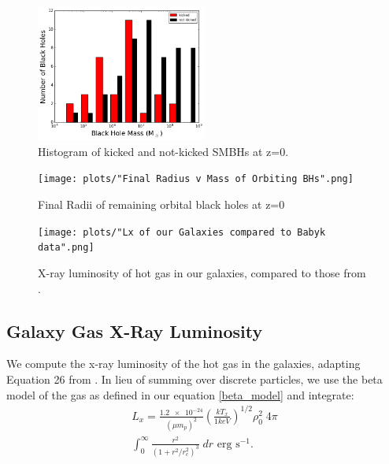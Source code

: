 \documentclass[english, apj]{emulateapj}
\begin{document}
\begin{figure}[ht]
\begin{center}
\includegraphics[width=0.5\textwidth]{plots/kicked_stats.png}
\caption{Histogram of kicked and not-kicked SMBHs at z=0.}
\label{fig:kicked_stats}
\end{center}
\end{figure}

\begin{figure}[htbp]
\begin{center}
\texttt{[image: plots/"Final Radius v Mass of Orbiting BHs".png]}
\caption{Final Radii of remaining orbital black holes at z=0}
\label{fig:mvr}
\end{center}
\end{figure}

\begin{figure}[htbp]
\vspace{20pt}%
\begin{center}
\texttt{[image: plots/"Lx of our Galaxies compared to Babyk data".png]}
\caption{X-ray luminosity of hot gas in our galaxies, compared to those from \citet{2018ApJ...857...32B}.}
\label{fig:galgas1}
\end{center}
\end{figure}

\subsection{Galaxy Gas X-Ray Luminosity}
We compute the x-ray luminosity of the hot gas in the galaxies, adapting Equation 26 from \citet{2012ApJ...754..125C}. In lieu of summing over discrete particles, we use the beta model of the gas as defined in our equation \ref{beta_model} and integrate:
\begin{equation}
\begin{aligned}
    L_x ={} \frac{\num{1.2e-24}}{(\mu m_p)^2}\left(\frac{kT_x}{1keV}\right)^{1/2}\rho_0^{2}\;4{\pi} \\
    \int_{0}^{\infty}\frac{r^2}{(1+r^2/r_c^2)^{3}}\;dr\text{  erg s}^{-1}.
\end{aligned}
\end{equation}
\end{document}
